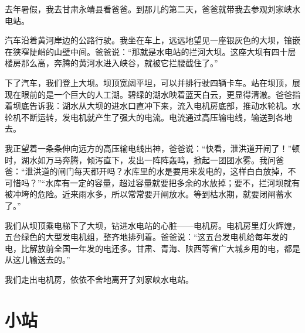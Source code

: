 \documentclass[12pt,UTF-8,openany]{ctexbook}
\begin{document}
\begin{Large}
    
    去年暑假，我去甘肃永靖县看爸爸。到那儿的第二天，爸爸就带我去参观刘家峡水电站。
    
    汽车沿着黄河岸边的公路行驶。我坐在车上，远远地望见一座银灰色的大坝，镶嵌在狭窄陡峭的山壁中间。爸爸说：“那就是水电站的拦河大坝。这座大坝有四十层楼房那么高，奔腾的黄河水进入峡谷，就被它拦腰截住了。”
    
    下了汽车，我们登上大坝。坝顶宽阔平坦，可以并排行驶四辆卡车。站在坝顶，展现在眼前的是一个巨大的人工湖。碧绿的湖水映着蓝天白云，更显得清澈。爸爸指着坝底告诉我：湖水从大坝的进水口直冲下来，流入电机房底部，推动水轮机。水轮机不断运转，发电机就产生了强大的电流。电流通过高压输电线，输送到各地去。
    
    我正望着一条条伸向远方的高压输电线出神，爸爸说：“快看，泄洪道开闸了！”顿时，湖水如万马奔腾，倾泻直下，发出一阵阵轰鸣，掀起一团团水雾。我问爸爸：“泄洪道的闸门每天都开吗？水库里的水是要用来发电的，这样白白放掉，不可惜吗？”“水库有一定的容量，超过容量就要把多余的水放掉；要不，拦河坝就有被冲垮的危险。近来雨水多，所以常常要开闸放水。等到枯水期，就要闭闸蓄水了。”
    
    我们从坝顶乘电梯下了大坝，钻进水电站的心脏——电机房。电机房里灯火辉煌，五台绿色的大型发电机组，整齐地排列着。爸爸说：“这五台发电机给每年发的电，比解放前全国一年发的电还多。甘肃、青海、陕西等省广大城乡用的电，都是从这儿输送去的。”
    
    我们走出电机房，依依不舍地离开了刘家峡水电站。
    
\end{Large}

\chapter{小站}
\end{document}
